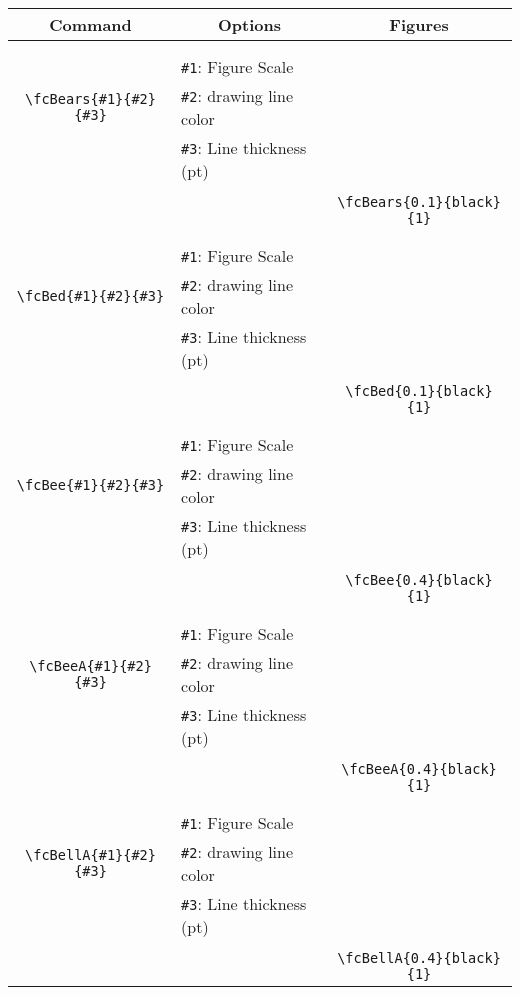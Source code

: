 \documentclass[x11names]{article}
\begin{document}
\begin{table}[H]\centering\begin{tabular}{|c|l|c|}\hline {\bf Command}& \multicolumn{1}{c|}{{\bf Options}} & {\bf Figures}\\  \hline	&&\multirow{5}{*}{\fcBears{0.1}{black}{1}}\\	&&\\	&\verb|#1|: Figure Scale &\\	\verb|\fcBears{#1}{#2}{#3}|&	\verb|#2|: drawing line color &\\	&\verb|#3|: Line thickness (pt) &\\ &&\\&&	\verb|\fcBears{0.1}{black}{1}|\\\hline 	
	&&\multirow{5}{*}{\fcBed{0.1}{black}{1}}\\	&&\\	&\verb|#1|: Figure Scale &\\	\verb|\fcBed{#1}{#2}{#3}|&	\verb|#2|: drawing line color &\\	&\verb|#3|: Line thickness (pt) &\\ &&\\&&	\verb|\fcBed{0.1}{black}{1}|\\\hline 	
	&&\multirow{5}{*}{\fcBee{0.4}{black}{1}}\\	&&\\	&\verb|#1|: Figure Scale &\\	\verb|\fcBee{#1}{#2}{#3}|&	\verb|#2|: drawing line color &\\	&\verb|#3|: Line thickness (pt) &\\ &&\\&&	\verb|\fcBee{0.4}{black}{1}|\\\hline 	
	&&\multirow{5}{*}{\fcBeeA{0.4}{black}{1}}\\	&&\\	&\verb|#1|: Figure Scale &\\	\verb|\fcBeeA{#1}{#2}{#3}|&	\verb|#2|: drawing line color &\\	&\verb|#3|: Line thickness (pt) &\\ &&\\&&	\verb|\fcBeeA{0.4}{black}{1}|\\\hline 	
	&&\multirow{5}{*}{\fcBellA{0.4}{black}{1}}\\	&&\\	&\verb|#1|: Figure Scale &\\	\verb|\fcBellA{#1}{#2}{#3}|&	\verb|#2|: drawing line color &\\	&\verb|#3|: Line thickness (pt) &\\ &&\\&&	\verb|\fcBellA{0.4}{black}{1}|\\\hline 	

\end{tabular}
\end{table}
\end{document}
